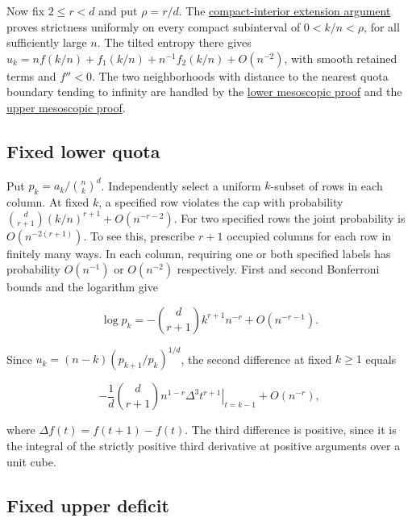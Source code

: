 \documentclass[11pt]{article}
\begin{document}
Now fix $2\le r<d$ and put $\rho=r/d$. The \href{https://github.com/ProgramComputer/open-math-research/blob/27e3e70d6603e8a395c5fdb7ff944922bce83380/topics/balanced-arrays/engset-curvature/finite-extension.md#fixed-dimensions-compact-interior}{compact-interior extension argument} proves strictness uniformly on every compact subinterval of $0<k/n<\rho$, for all sufficiently large $n$. The tilted entropy there gives $u_k=n f(k/n)+f_1(k/n)+n^{-1} f_2(k/n)+O(n^{-2})$, with smooth retained terms and $f''<0$. The two neighborhoods with distance to the nearest quota boundary tending to infinity are handled by the \hyperref[sec:lower]{lower mesoscopic proof} and the \hyperref[sec:upper]{upper mesoscopic proof}.

\subsection{Fixed lower quota}

Put $p_k=a_k/\binom nk^d$. Independently select a uniform $k$-subset of rows in each column. At fixed $k$, a specified row violates the cap with probability $\binom d{r+1}(k/n)^{r+1}+O(n^{-r-2})$. For two specified rows the joint probability is $O(n^{-2(r+1)})$. To see this, prescribe $r+1$ occupied columns for each row in finitely many ways. In each column, requiring one or both specified labels has probability $O(n^{-1})$ or $O(n^{-2})$ respectively. First and second Bonferroni bounds and the logarithm give

\begin{equation*}
\log p_k=-\binom d{r+1} k^{r+1}n^{-r}+O(n^{-r-1}).
\end{equation*}

Since $u_k=(n-k)(p_{k+1}/p_k)^{1/d}$, the second difference at fixed $k\ge1$ equals

\begin{equation*}
-\frac1d\binom d{r+1} n^{1-r}
\left.\Delta^3 t^{r+1}\right|_{t=k-1}+O(n^{-r}),
\end{equation*}

where $\Delta f(t)=f(t+1)-f(t)$. The third difference is positive, since it is the integral of the strictly positive third derivative at positive arguments over a unit cube.

\subsection{Fixed upper deficit}
\end{document}
